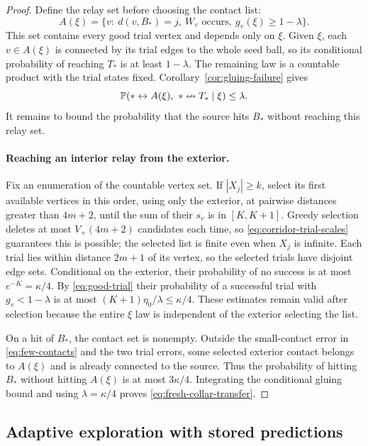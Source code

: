 \begin{proof}
Define the relay set before choosing the contact list:
\[
 A(\xi)=\{v:\ d(v,B_*)=j,\ W_v\text{ occurs},\ g_v(\xi)\ge1-\lambda\}.
\]
This set contains every good trial vertex and depends only on $\xi$.
Given $\xi$, each $v\in A(\xi)$ is connected by its trial edges to
the whole seed ball, so its conditional probability of reaching $T_*$
is at least $1-\lambda$. The remaining law is a countable product
with the trial states fixed. Corollary~\ref{cor:gluing-failure} gives
\begin{equation*}
 \mathbb P(*\leftrightarrow A(\xi),\ *\nleftrightarrow T_*\mid\xi)
       \le\lambda.
\end{equation*}
It remains to bound the probability that the source hits $B_*$
without reaching this relay set.

\paragraph{Reaching an interior relay from the exterior.}
Fix an enumeration of the countable vertex set. If $|X_j|\ge k$,
select its first available vertices in this order, using only the
exterior, at pairwise distances greater than $4m+2$, until
the sum of their $s_v$ is in $[K,K+1]$. Greedy selection deletes at
most $V_+(4m+2)$ candidates each time, so
\eqref{eq:corridor-trial-scales} guarantees this is possible; the
selected list is finite even when $X_j$ is infinite. Each trial lies
within distance $2m+1$ of its vertex, so the selected trials have
disjoint edge sets. Conditional on the exterior, their probability
of no success is at most $e^{-K}=\kappa/4$. By
\eqref{eq:good-trial} their probability of a successful trial with
$g_v<1-\lambda$ is at most
$(K+1)\eta_0/\lambda\le\kappa/4$. These estimates remain valid
after selection because the entire $\xi$ law is independent of
the exterior selecting the list.

On a hit of $B_*$, the contact set is nonempty. Outside the small-contact
error in \eqref{eq:few-contacts} and the two trial errors, some selected
exterior contact belongs to $A(\xi)$ and is already connected to the
source. Thus the probability of hitting $B_*$ without hitting $A(\xi)$
is at most $3\kappa/4$. Integrating the conditional gluing bound and
using $\lambda=\kappa/4$ proves \eqref{eq:fresh-collar-transfer}.
\end{proof}

\subsection{Adaptive exploration with stored predictions}

